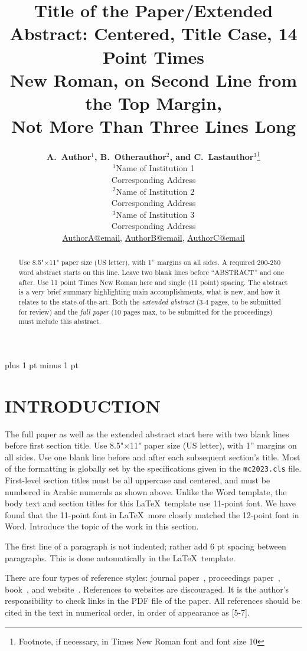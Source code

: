 \documentclass[letterpaper]{mc2023}
\title{Title of the Paper/Extended Abstract: Centered, Title Case, 14 Point Times \\
  New Roman, on Second Line from the Top Margin,\\ Not
  More Than Three Lines Long}
\author{%
  \textbf{A.~Author$^1$, B.~Otherauthor$^2$, and C.~Lastauthor$^3$}\footnote{Footnote, if necessary, in Times New Roman font and font size 10}\vspace{3pt} \\
  $^1$Name of Institution 1  \\
  Corresponding Address \vspace{6pt}\\
  $^2$Name of Institution 2  \\
    Corresponding Address\vspace{6pt} \\
  $^3$Name of Institution 3  \\
     Corresponding Address\vspace{6pt} \\
  \url{AuthorA@email}, \url{AuthorB@email}, \url{AuthorC@email}
}
\begin{document}
\maketitle
\justify
\parskip 6pt plus 1 pt minus 1 pt

\begin{abstract}
  Use 8.5"$\times$11" paper size (US letter), with 1'' margins on all sides.  A required 200-250
  word abstract starts on this line.  Leave two blank lines before ``ABSTRACT''
  and one after.  Use 11 point Times New Roman here and single (11 point)
  spacing. The abstract is a very brief summary highlighting main
  accomplishments, what is new, and how it relates to the state-of-the-art.
Both the {\it extended abstract} (3-4 pages, to be submitted for review) and the {\it full paper} (10 pages max, to be submitted for the proceedings) must include this abstract.
\end{abstract}
\vspace{6pt}

\section{INTRODUCTION}
The full paper as well as the extended abstract start here with two blank lines before first section title.  Use
8.5"$\times$11" paper size (US letter), with 1'' margins on all sides.  Use one blank line
before and after each subsequent section's title.  Most of the formatting is globally
set by the specifications given in the \texttt{mc2023.cls} file.
First-level section titles must be all uppercase and centered, and must
be numbered in Arabic numerals as shown above.  Unlike the Word template, the body
text and section titles for this \LaTeX\ template use
11-point font.  We have found that the 11-point font in \LaTeX\ more closely
matched the 12-point font in Word.  Introduce the topic of the work
in this section.

The first line of a paragraph is not indented; rather add 6 pt spacing between
paragraphs.  This is done automatically in the \LaTeX\ template.

There are four types of reference styles: journal paper~\cite{journal},
proceedings paper~\cite{proc_paper}, book~\cite{book}, and website~\cite{website}.
References to websites are discouraged. It
is the author's responsibility to check links in the PDF file of the paper.
All references should be cited in the text in numerical order, in order of
appearance as [5-7].
\end{document}
